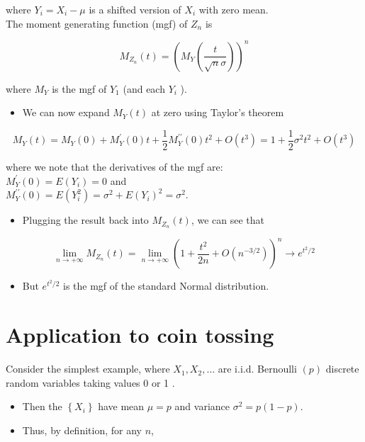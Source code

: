 \documentclass[10pt]{article}
\begin{document}
where $Y_{i}=X_{i}-\mu$ is a shifted version of $X_{i}$ with zero mean.\\
The moment generating function (mgf) of $Z_{n}$ is

$$
M_{Z_{n}}(t)=\left(M_{Y}\left(\frac{t}{\sqrt{n} \sigma}\right)\right)^{n}
$$

where $M_{Y}$ is the mgf of $Y_{1}$ (and each $Y_{i}$ ).

\begin{itemize}
  \item We can now expand $M_{Y}(t)$ at zero using Taylor's theorem
\end{itemize}

$$
M_{Y}(t)=M_{Y}(0)+M_{Y}^{\prime}(0) t+\frac{1}{2} M_{Y}^{\prime \prime}(0) t^{2}+O\left(t^{3}\right)=1+\frac{1}{2} \sigma^{2} t^{2}+O\left(t^{3}\right)
$$

where we note that the derivatives of the mgf are:\\
$M_{Y}^{\prime}(0)=E\left(Y_{i}\right)=0$ and\\
$M_{Y}^{\prime \prime}(0)=E\left(Y_{i}^{2}\right)=\sigma^{2}+E\left(Y_{i}\right)^{2}=\sigma^{2}$.

\begin{itemize}
  \item Plugging the result back into $M_{Z_{n}}(t)$, we can see that
\end{itemize}

$$
\lim _{n \rightarrow+\infty} M_{Z_{n}}(t)=\lim _{n \rightarrow+\infty}\left(1+\frac{t^{2}}{2 n}+O\left(n^{-3 / 2}\right)\right)^{n} \rightarrow e^{t^{2} / 2}
$$

\begin{itemize}
  \item But $e^{t^{2} / 2}$ is the mgf of the standard Normal distribution.
\end{itemize}

\section*{Application to coin tossing}
Consider the simplest example, where $X_{1}, X_{2}, \ldots$ are i.i.d. Bernoulli $(p)$ discrete random variables taking values 0 or 1 .

\begin{itemize}
  \item Then the $\left\{X_{i}\right\}$ have mean $\mu=p$ and variance $\sigma^{2}=p(1-p)$.
  \item Thus, by definition, for any $n$,
\end{itemize}
\end{document}
